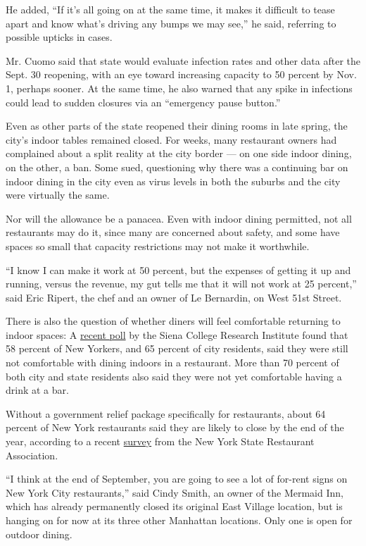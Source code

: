 He added, ``If it's all going on at the same time, it makes it difficult
to tease apart and know what's driving any bumps we may see,'' he said,
referring to possible upticks in cases.

Mr. Cuomo said that state would evaluate infection rates and other data
after the Sept. 30 reopening, with an eye toward increasing capacity to
50 percent by Nov. 1, perhaps sooner. At the same time, he also warned
that any spike in infections could lead to sudden closures via an
``emergency pause button.''

Even as other parts of the state reopened their dining rooms in late
spring, the city's indoor tables remained closed. For weeks, many
restaurant owners had complained about a split reality at the city
border --- on one side indoor dining, on the other, a ban. Some sued,
questioning why there was a continuing bar on indoor dining in the city
even as virus levels in both the suburbs and the city were virtually the
same.

Nor will the allowance be a panacea. Even with indoor dining permitted,
not all restaurants may do it, since many are concerned about safety,
and some have spaces so small that capacity restrictions may not make it
worthwhile.

``I know I can make it work at 50 percent, but the expenses of getting
it up and running, versus the revenue, my gut tells me that it will not
work at 25 percent,'' said Eric Ripert, the chef and an owner of Le
Bernardin, on West 51st Street.

There is also the question of whether diners will feel comfortable
returning to indoor spaces: A
\href{https://scri.siena.edu/2020/09/02/62-say-completely-opening-schools-runs-too-great-a-risk-32-disagree/}{recent
poll} by the Siena College Research Institute found that 58 percent of
New Yorkers, and 65 percent of city residents, said they were still not
comfortable with dining indoors in a restaurant. More than 70 percent of
both city and state residents also said they were not yet comfortable
having a drink at a bar.

Without a government relief package specifically for restaurants, about
64 percent of New York restaurants said they are likely to close by the
end of the year, according to a recent
\href{https://www.nysra.org/uploads/1/2/1/3/121352550/state_restaurant_association_survey_results_090320.pdf}{survey}
from the New York State Restaurant Association.

``I think at the end of September, you are going to see a lot of
for-rent signs on New York City restaurants,'' said Cindy Smith, an
owner of the Mermaid Inn, which has already permanently closed its
original East Village location, but is hanging on for now at its three
other Manhattan locations. Only one is open for outdoor dining.

